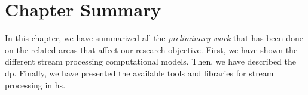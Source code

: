 \section{Chapter Summary}

In this chapter, we have summarized all the \emph{preliminary work} that has been done on the related areas that affect our research objective.
First, we have shown the different stream processing computational models. Then, we have described the \acrshort{dp}.  
Finally, we have presented the available tools and libraries for stream processing  in \acrshort{hs}.
